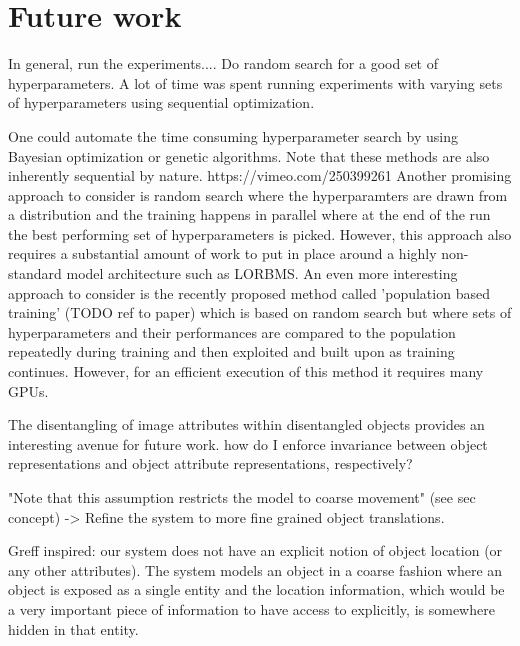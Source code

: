 \documentclass[12pt,a4paper]{article}
\begin{document}
\section{Future work}
In general, run the experiments.... Do random search for a good set of hyperparameters. A lot of time was spent running experiments with varying sets of hyperparameters using sequential optimization.

\par One could automate the time consuming hyperparameter search by using Bayesian optimization or genetic algorithms. Note that these methods are also inherently sequential by nature. https://vimeo.com/250399261
Another promising approach to consider is random search where the hyperparamters are drawn from a distribution and the training happens in parallel where at the end of the run the best performing set of hyperparameters is picked. However, this approach also requires a substantial amount of work to put in place around a highly non-standard model architecture such as LORBMS. An even more interesting approach to consider is the recently proposed method called 'population based training' (TODO ref to paper) which is based on random search but where sets of hyperparameters and their performances are compared to the population repeatedly during training and then exploited and built upon as training continues. However, for an efficient execution of this method it requires many GPUs. 

\par The disentangling of image attributes within disentangled objects provides an interesting avenue for future work. how do I enforce invariance between object representations and object attribute representations, respectively?

\par "Note that this assumption restricts the model to coarse movement" (see sec concept) -> Refine the system to more fine grained object translations.

\par Greff inspired: our system does not have an explicit notion of object location (or any other attributes). The system models an object in a coarse fashion where an object is exposed as a single entity and the location information, which would be a very important piece of information to have access to explicitly, is somewhere hidden in that entity.
\end{document}
